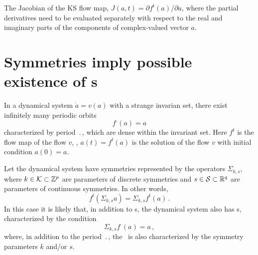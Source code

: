 The Jacobian of the KS flow map, $J(a,t) = \partial f^t(a)/\partial
a$, where the partial derivatives need to be evaluated separately
with respect to the real and imaginary parts of the components of
complex-valued vector $a$.



\section{Symmetries imply possible existence of \rpo s}
\label{sec:SymRPO}
In a dynamical system $\dot{a} = v(a)$ with a strange invarian set, there exist
infinitely many periodic orbits
\[ f^\period{}(a) = a \]
characterized by period $\period{}$, which are dense within the invariant set.
Here $f^t$ is the flow map of the flow $v$, \ie, $a(t) = f^t(a)$ is the
solution of the flow $v$ with initial condition $a(0) = a$.

Let the dynamical system have symmetries represented by the operators
$\Sigma_{k,s}$, where $k \in {\cal K} \subset \mathbb{Z}^p$ are
parameters of discrete symmetries and $s \in {\cal S} \subset \mathbb{R}^q$
are parameters of continuous symmetries.  In other words,
\[ f^t(\Sigma_{k,s} a) = \Sigma_{k,s} f^t(a)\,. \]
In this case it is likely that, in addition to \po s, the dynamical system also
has \rpo s, characterized by the condition
\[ \Sigma_{k,s}f^\period{}(a) = a\,, \]
where, in addition to the period $\period{}$, the \rpo\ is also characterized by
the symmetry parameters $k$ and/or $s$.

